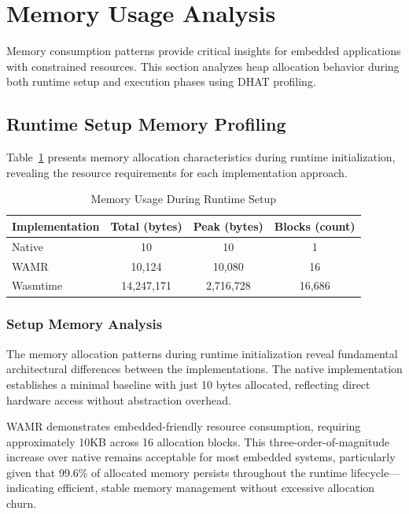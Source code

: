 \section{Memory Usage Analysis}
\label{sec:eval-memory}

Memory consumption patterns provide critical insights for embedded applications with constrained resources. This section analyzes heap allocation behavior during both runtime setup and execution phases using DHAT profiling.

\subsection{Runtime Setup Memory Profiling}
\label{subsec:memory-setup}

Table~\ref{tab:memory-setup} presents memory allocation characteristics during runtime initialization, revealing the resource requirements for each implementation approach.

\begin{table}[h]
    \centering
    \caption{Memory Usage During Runtime Setup}
    \label{tab:memory-setup}
    \begin{tabular}{lccc}
        \toprule
        \textbf{Implementation} & \textbf{Total (bytes)} & \textbf{Peak (bytes)} & \textbf{Blocks (count)} \\
        \midrule
        Native        & 10          & 10        & 1 \\
        WAMR          & 10,124      & 10,080    & 16 \\
        Wasmtime      & 14,247,171  & 2,716,728 & 16,686 \\
        \bottomrule
    \end{tabular}
\end{table}

\subsubsection{Setup Memory Analysis}

The memory allocation patterns during runtime initialization reveal fundamental architectural differences between the implementations. The native implementation establishes a minimal baseline with just 10 bytes allocated, reflecting direct hardware access without abstraction overhead.

WAMR demonstrates embedded-friendly resource consumption, requiring approximately 10KB across 16 allocation blocks. This three-order-of-magnitude increase over native remains acceptable for most embedded systems, particularly given that 99.6\% of allocated memory persists throughout the runtime lifecycle—indicating efficient, stable memory management without excessive allocation churn.

